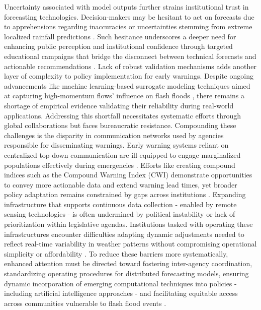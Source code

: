 Uncertainty associated with model outputs further strains institutional trust in forecasting technologies. Decision-makers may be hesitant to act on forecasts due to apprehensions regarding inaccuracies or uncertainties stemming from extreme localized rainfall predictions \citep{Martinaitis2023}. Such hesitance underscores a deeper need for enhancing public perception and institutional confidence through targeted educational campaigns that bridge the disconnect between technical forecasts and actionable recommendations \citep{Henderson2020}.
Lack of robust validation mechanisms adds another layer of complexity to policy implementation for early warnings. Despite ongoing advancements like machine learning-based surrogate modeling techniques aimed at capturing high-momentum flows' influence on flash floods \citep{Msigwa2024}, there remains a shortage of empirical evidence validating their reliability during real-world applications. Addressing this shortfall necessitates systematic efforts through global collaborations but faces bureaucratic resistance.
Compounding these challenges is the disparity in communication networks used by agencies responsible for disseminating warnings. Early warning systems reliant on centralized top-down communication are ill-equipped to engage marginalized populations effectively during emergencies \citep{Henao2022}. Efforts like creating compound indices such as the Compound Warning Index (CWI) demonstrate opportunities to convey more actionable data and extend warning lead times, yet broader policy adaptation remains constrained by gaps across institutions \citep{Henao2022a}.
Expanding infrastructure that supports continuous data collection - enabled by remote sensing technologies - is often undermined by political instability or lack of prioritization within legislative agendas. Institutions tasked with operating these infrastructures encounter difficulties adapting dynamic adjustments needed to reflect real-time variability in weather patterns without compromising operational simplicity or affordability \citep{Georgakakos2022}\citep{Abegaz2024}.
To reduce these barriers more systematically, enhanced attention must be directed toward fostering inter-agency coordination, standardizing operating procedures for distributed forecasting models, ensuring dynamic incorporation of emerging computational techniques into policies - including artificial intelligence approaches - and facilitating equitable access across communities vulnerable to flash flood events \citep{AlRawas2024}\citep{Yang2022}.

